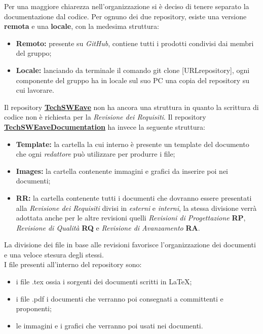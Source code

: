         Per una maggiore chiarezza nell'organizzazione si è deciso di tenere separato la documentazione dal codice.
        Per ognuno dei due repository, esiste una versione \textbf{remota} e una \textbf{locale}, con la medesima struttura: 
        \begin{itemize}
            \item \textbf{Remoto:} presente su \textit{GitHub}, contiene tutti i prodotti condivisi dai membri del gruppo;
            \item \textbf{Locale:} lanciando da terminale il comando {\selectfont git clone [URLrepository]}, ogni componente del gruppo ha in locale sul suo PC una copia del repository su cui lavorare.
        \end{itemize} 
        Il repository \textcolor{blue}{\underline{\textbf{\href{https://github.com/techsweave/TechSWEave.git}{TechSWEave}}}} non ha ancora una struttura in quanto la scrittura di codice non è richiesta per la \textit{Revisione dei Requisiti}. 
        Il repository  \textcolor{blue}{\underline{\textbf{\href{https://github.com/techsweave/TechSWEaveDocumentation.git}{TechSWEaveDocumentation}}}} ha invece la seguente struttura:
        \begin{itemize}
            \item \textbf{Template:} la cartella la cui interno è presente un template del documento che ogni \textit{redattore} può utilizzare per produrre i file;
            \item \textbf{Images:} la cartella contenente immagini e grafici da inserire poi nei documenti;
            \item \textbf{RR:} la cartella contenente tutti i documenti che dovranno essere presentati alla \textit{Revisione dei Requisiti} divisi in \textit{esterni} e \textit{interni}, la stessa divisione verrà adottata anche per le altre revisioni quelli \textit{Revisioni di Progettazione} \textbf{RP}, \textit{Revisione di Qualità} \textbf{RQ} e \textit{Revisione di Avanzamento} \textbf{RA}.
        \end{itemize}
        La divisione dei file in base alle revisioni favorisce l'organizzazione dei documenti e una veloce stesura degli stessi.\\
        I file presenti all'interno del repository sono:
        \begin{itemize}
            \item i file {\selectfont .tex} ossia i sorgenti dei documenti scritti in \LaTeX;
            \item i file {\selectfont .pdf} i documenti che verranno poi consegnati a committenti e proponenti;
            \item le immagini e i grafici che verranno poi usati nei documenti.
        \end{itemize}
